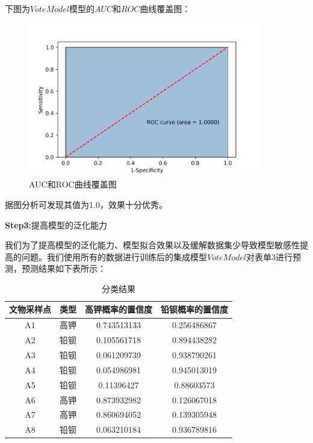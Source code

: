 \documentclass[UTF8]{ctexart}
\begin{document}
下图为$VoteModel$模型的$AUC$和$ROC$曲线覆盖图：

\begin{figure}[H]\centering
    \includegraphics[width=0.9\textwidth]{img/AUC.png} %
    \caption{AUC和ROC曲线覆盖图} %
    \label{fig:figure 10} %
\end{figure}

据图分析可发现其值为1.0，效果十分优秀。

\textbf{Step3:}提高模型的泛化能力

我们为了提高模型的泛化能力、模型拟合效果以及缓解数据集少导致模型敏感性提高的问题。我们使用所有的数据进行训练后的集成模型$VoteModel$对表单3进行预测，预测结果如下表所示：

\begin{table}[H]
    \centering
    \caption{分类结果}
    \begin{tabular}{|c|c|c|c|}
        \hline
        文物采样点 & 类型 & 高钾概率的置信度 & 铅钡概率的置信度 \\ \hline
        A1         & 高钾 & 0.743513133      & 0.256486867      \\ \hline
        A2         & 铅钡 & 0.105561718      & 0.894438282      \\ \hline
        A3         & 铅钡 & 0.061209739      & 0.938790261      \\ \hline
        A4         & 铅钡 & 0.054986981      & 0.945013019      \\ \hline
        A5         & 铅钡 & 0.11396427       & 0.88603573       \\ \hline
        A6         & 高钾 & 0.873932982      & 0.126067018      \\ \hline
        A7         & 高钾 & 0.860694052      & 0.139305948      \\ \hline
        A8         & 铅钡 & 0.063210184      & 0.936789816      \\ \hline
    \end{tabular}
\end{table}
\end{document}
